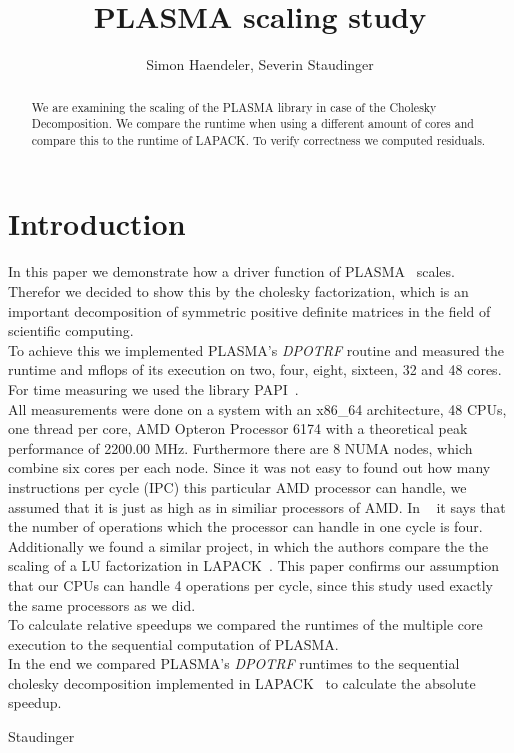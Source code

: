 \documentclass[a4paper,final,ngerman,english]{article}
\begin{document}
\lstset{postbreak=\space,breakindent=5pt,breaklines,basicstyle=\scriptsize,frame=trbl,label=DescriptiveLabel} %
\pagestyle{headings}
%
\title{PLASMA scaling study}
\author{Simon Haendeler, Severin Staudinger}
\maketitle
%
\begin{abstract}
	We are examining the scaling of the PLASMA library in case of the Cholesky Decomposition.
	We compare the runtime when using a different amount of cores and compare this to the runtime
	of LAPACK\@. To verify correctness we computed residuals. 
\end{abstract}
\section{Introduction}
In this paper we demonstrate how a driver function of PLASMA~\cite{plasma01} scales.
Therefor we decided to show this by the cholesky factorization, which is an important decomposition of symmetric positive definite matrices in the field of scientific computing.\\
To achieve this we implemented PLASMA's \textit{DPOTRF} routine and measured the runtime and mflops of its execution on two, four, eight, sixteen, 32 and 48 cores. For time measuring we used the library PAPI~\cite{icl:59}.\\
All measurements were done on a system with an x86\_64 architecture, 48 CPUs, one thread per core, AMD Opteron\texttrademark{} Processor 6174 with a theoretical peak performance of 2200.00 MHz. Furthermore there are 8 NUMA nodes, which combine six cores per each node.
Since it was not easy to found out how many instructions per cycle (IPC) this particular AMD processor can handle, we assumed that it is just as high as in similiar processors of AMD. In ~\cite{amd05} it says that the number of operations which the processor can handle in one cycle is four.
Additionally we found a similar project, in which the authors compare the the scaling of a LU factorization in LAPACK~\cite{lawn266}. This paper confirms our assumption that our CPUs can handle 4 operations per cycle, since this study used exactly the same processors as we did.\\
To calculate relative speedups we compared the runtimes of the multiple core execution to the sequential computation of PLASMA.\\
In the end we compared PLASMA's \textit{DPOTRF} runtimes to the sequential cholesky decomposition implemented in LAPACK~\cite{lapack03} to calculate the absolute speedup.
\begin{flushright} Staudinger \end{flushright}
\end{document}

